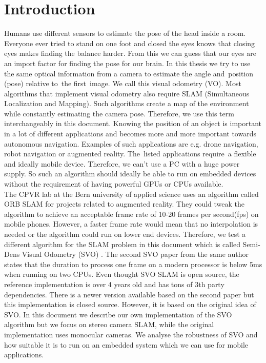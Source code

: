 \documentclass[11pt,a4paper,titlepage,oneside]{report}
\begin{document}
\tableofcontents

\chapter{Introduction}

Humans use different sensors to estimate the pose of the head inside a room. Everyone ever tried to stand on one foot and closed the eyes knows that closing eyes makes finding the balance harder. From this we can guess that our eyes are an import factor for finding the pose for our brain. In this thesis we try to use the same optical information from a camera to estimate the angle and position (pose) relative to the first image. We call this visual odometry (VO). Most algorithms that implement visual odometry also require SLAM (Simultaneous Localization and Mapping). Such algorithms create a map of the environment while constantly estimating the camera pose. Therefore, we use this term interchangeably in this document. Knowing the position of an object is important in a lot of different applications and becomes more and more important towards autonomous navigation. Examples of such applications are e.g. drone navigation, robot navigation or augmented reality. The listed applications require a flexible and ideally mobile device. Therefore, we can’t use a PC with a huge power supply. So such an algorithm should ideally be able to run on embedded devices without the requirement of having powerful GPUs or CPUs available.\\
The CPVR lab at the Bern university of applied science uses an algorithm called ORB SLAM \cite{orbslam} for projects related to augmented reality. They could tweak the algorithm to achieve an acceptable frame rate of 10-20 frames per second(fps) on mobile phones. However, a faster frame rate would mean that no interpolation is needed or the algorithm could run on lower end devices. Therefore, we test a different algorithm for the SLAM problem in this document which is called Semi-Dens Visual Odometry (SVO) \cite{svo}. The second SVO paper \cite{svo2} from the same author states that the duration to process one frame on a modern processor is below 5ms when running on two CPUs. Even thought SVO SLAM is open source, the reference implementation is over 4 years old and has tons of 3th party dependencies. There is a newer version available based on the second paper but this implementation is closed source. However, it is based on the original idea of SVO. In this document we describe our own implementation of the SVO algorithm but we focus on stereo camera SLAM, while the original implementation uses monocular cameras. We analyse the robustness of SVO and how suitable it is to run on an embedded system which we can use for mobile applications.
\end{document}
